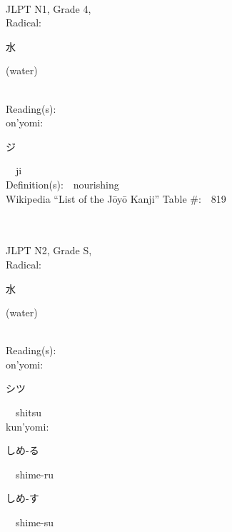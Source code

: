 \begin{multicols}{2}
{\fontsize{34pt}{40pt}  }\ \ \\  %
{JLPT N1, Grade 4, \\Radical:\ \ {\begin{CJK}{UTF8}{min} 水 \end{CJK}} (water) } \\
Reading(s):\ \ \\
{\hspace*{1em}}on'yomi:\ \ \\
{\hspace*{2em}}{\begin{CJK}{UTF8}{min} ジ \end{CJK}}\ \ ji\ \ \\
Definition(s):\ \ nourishing \\
Wikipedia ``List of the J\=oy\=o Kanji'' Table \#:\ \ 819 \\
\ \ \\
{\fontsize{34pt}{40pt}  }\ \ \\  %
{JLPT N2, Grade S, \\Radical:\ \ {\begin{CJK}{UTF8}{min} 水 \end{CJK}} (water) } \\
Reading(s):\ \ \\
{\hspace*{1em}}on'yomi:\ \ \\
{\hspace*{2em}}{\begin{CJK}{UTF8}{min} シツ \end{CJK}}\ \ shitsu\ \ \\
{\hspace*{1em}}kun'yomi:\ \ \\
{\hspace*{2em}}{\begin{CJK}{UTF8}{min} しめ-る \end{CJK}}\ \ shime-ru\ \ \\
{\hspace*{2em}}{\begin{CJK}{UTF8}{min} しめ-す \end{CJK}}\ \ shime-su\ \ \\

\end{multicols}
